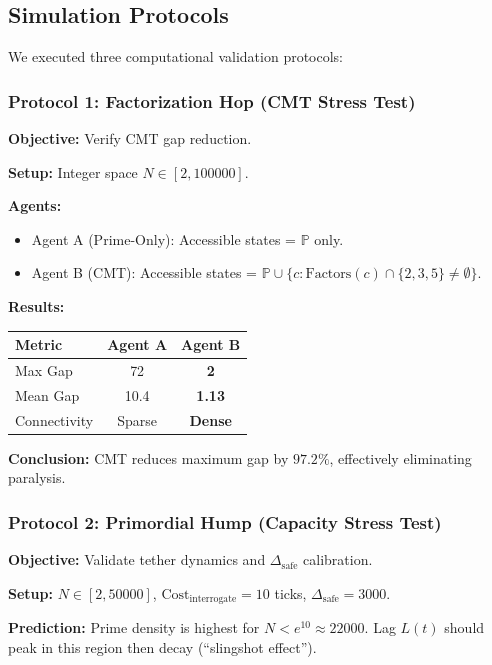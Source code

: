 \documentclass[12pt,a4paper]{article}
\begin{document}
\subsection{Simulation Protocols}

We executed three computational validation protocols:

\subsubsection{Protocol 1: Factorization Hop (CMT Stress Test)}

\textbf{Objective:} Verify CMT gap reduction.

\textbf{Setup:} Integer space $N \in [2, 100000]$.

\textbf{Agents:}
\begin{itemize}
\item Agent A (Prime-Only): Accessible states = $\mathbb{P}$ only.
\item Agent B (CMT): Accessible states = $\mathbb{P} \cup \{c : \text{Factors}(c) \cap \{2,3,5\} \neq \emptyset\}$.
\end{itemize}

\textbf{Results:}
\begin{center}
\begin{tabular}{lcc}
\toprule
Metric & Agent A & Agent B \\
\midrule
Max Gap & 72 & \textbf{2} \\
Mean Gap & 10.4 & \textbf{1.13} \\
Connectivity & Sparse & \textbf{Dense} \\
\bottomrule
\end{tabular}
\end{center}

\textbf{Conclusion:} CMT reduces maximum gap by $97.2\%$, effectively eliminating paralysis.

\subsubsection{Protocol 2: Primordial Hump (Capacity Stress Test)}

\textbf{Objective:} Validate tether dynamics and $\Delta_{\text{safe}}$ calibration.

\textbf{Setup:} $N \in [2, 50000]$, $\text{Cost}_{\text{interrogate}} = 10$ ticks, $\Delta_{\text{safe}} = 3000$.

\textbf{Prediction:} Prime density is highest for $N < e^{10} \approx 22000$. Lag $L(t)$ should peak in this region then decay (``slingshot effect'').
\end{document}

